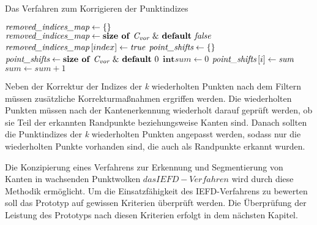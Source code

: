 \begin{algorithm}
	\caption{Das Verfahren zum Korrigieren der Punktindizes}
	\label{alg: mark_points}
	\begin{algorithmic}[1]
		\State $\textit{removed\textunderscore indices\textunderscore map} \gets \text{\{\}}$
		\State $\textit{removed\textunderscore indices\textunderscore map} \gets \text{\textbf{size of} \textit{C\textsubscript{vor}} \& \textbf{default} \textit{false}}$
		\State $\textit{removed\textunderscore indices\textunderscore map} \left[index\right] \gets \textit{true}$
		\EndFor
		\State $\textit{point\textunderscore shifts} \gets \text{\{\}}$
		\State $\textit{point\textunderscore shifts} \gets \text{\textbf{size of} \textit{C\textsubscript{vor}} \& \textbf{default} 0}$
		\State $\textbf{int} \textit{sum} \gets 0$
		\State $\textit{point\textunderscore shifts}\left[i\right] \gets \textit{sum}$
		\Else
		\State $\textit{sum} \gets \textit{sum} + 1$
		\EndIf
		\EndFor
		\EndFunction
	\end{algorithmic}
\end{algorithm}

Neben der Korrektur der Indizes der \textit{k} wiederholten Punkten nach dem Filtern müssen zusätzliche Korrekturmaßnahmen ergriffen werden. Die wiederholten Punkten müssen nach der Kantenerkennung wiederholt darauf geprüft werden, ob sie Teil der erkannten Randpunkte beziehungsweise Kanten sind. Danach sollten die Punktindizes der \textit{k} wiederholten Punkten angepasst werden, sodass nur die wiederholten Punkte vorhanden sind, die auch als Randpunkte erkannt wurden. 

Die Konzipierung eines Verfahrens zur Erkennung und Segmentierung von Kanten in wachsenden Punktwolken \(das IEFD-Verfahren\) wird durch diese Methodik ermöglicht. Um die Einsatzfähigkeit des IEFD-Verfahrens zu bewerten soll das Prototyp auf gewissen Kriterien überprüft werden. Die Überprüfung der Leistung des Prototyps nach diesen Kriterien erfolgt in dem nächsten Kapitel.